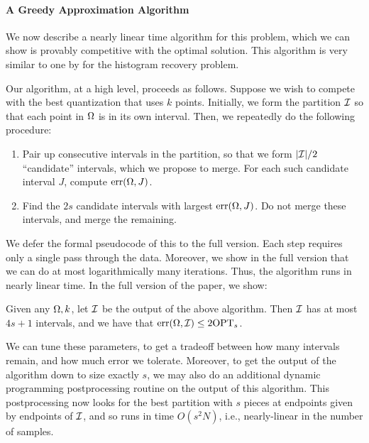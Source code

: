 \paragraph*{A Greedy Approximation Algorithm}
We now describe a nearly linear time algorithm for this problem, which we can show is provably competitive with the optimal solution.
This algorithm is very similar to one by \cite{ADHLS15} for the histogram recovery problem.

Our algorithm, at a high level, proceeds as follows.
Suppose we wish to compete with the best quantization that uses $k$ points.
Initially, we form the partition $\mathcal{I}$ so that each point in $\Omega$ is in its own interval.
Then, we repeatedly do the following procedure:
\begin{enumerate}
\item
Pair up consecutive intervals in the partition, so that we form $|\mathcal{I}| / 2$ ``candidate'' intervals, which we propose to merge.
For each such candidate interval $J$, compute $\mathrm{err}(\Omega, J)$.
\item
Find the $2 s$ candidate intervals with largest $\mathrm{err} (\Omega, J)$.
Do not merge these intervals, and merge the remaining.
\end{enumerate}

We defer the formal pseudocode of this to the full version.
Each step requires only a single pass through the data.
Moreover, we show in the full version that we can do at most logarithmically many iterations.
Thus, the algorithm runs in nearly linear time.
In the full version of the paper, we show:
\begin{theorem}
Given any $\Omega, k$, let $\mathcal{I}$ be the output of the above algorithm.
Then $\mathcal{I}$ has at most $4s + 1$ intervals, and we have that $\mathrm{err} (\Omega, \mathcal{I}) \leq 2 \mathrm{OPT}_s$.
\end{theorem}
We can tune these parameters, to get a tradeoff between how many intervals remain, and how much error we tolerate.
Moreover, to get the output of the algorithm down to size exactly $s$, we may also do an additional dynamic programming postprocessing routine on the output of this algorithm.
This postprocessing now looks for the best partition with $s$ pieces at endpoints given by endpoints of $\mathcal{I}$, and so runs in time $O(s^2 N)$, i.e., nearly-linear in the number of samples.
\fi










